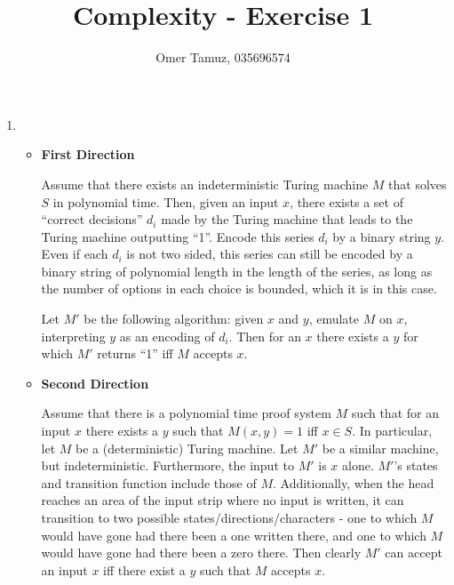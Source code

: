 \documentclass[11pt]{article} \usepackage{amssymb}
\begin{document}
\title{Complexity - Exercise 1}

 \author{Omer Tamuz, 035696574}
\maketitle


\begin{enumerate}
  \item
    \begin{itemize}
      Let $S$ be some decision problem. We would like to show that there exists
      an indeterministic Turing machine that solves it in polynomial time
      iff there exists a polynomial time proof system for it.
      \item {\bf First Direction}

        Assume that there exists an indeterministic Turing machine $M$ that
        solves $S$ in polynomial time. Then, given an input $x$, there exists
        a set of ``correct decisions'' $d_i$ made by the Turing machine that
        leads to the Turing machine outputting ``1''. Encode this series
        $d_i$ by a binary string $y$. Even if each $d_i$ is not two sided, this
        series can still be encoded by a binary string of polynomial length
        in the length of the series, as long as the number of options in each
        choice is bounded, which it is in this case.
        
        Let $M'$ be the following algorithm: given $x$ and $y$, emulate $M$
        on $x$, interpreting $y$ as an encoding of $d_i$. Then for an $x$
        there exists a $y$ for which $M'$ returns
        ``1'' iff $M$ accepts $x$.

      \item {\bf Second Direction}

        Assume that there is a polynomial time proof system $M$ such that for 
        an input $x$ there exists a $y$ such that $M(x,y)=1$ iff $x\in S$. 
        In particular, let $M$ be a (deterministic) Turing machine. Let $M'$
        be a similar machine, but indeterministic. Furthermore, the input to
        $M'$ is $x$ alone. $M'$'s states and transition function include
        those of $M$. Additionally, 
        when the head reaches an area of the input strip
        where no input is written, it can transition to two possible 
        states/directions/characters - one to which $M$ would have gone had
        there been a one written there, and one to which $M$ would have gone
        had there been a zero there. Then clearly $M'$ can accept an input
        $x$ iff there exist a $y$ such that $M$ accepts $x$.


\end{itemize}
\end{enumerate}
\end{document}
